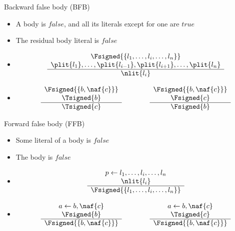 \begin{frame}{Backward false body (BFB)}
\begin{itemize}
\item {}
  A body is $\mathit{false}$, and all its literals except for one are $\mathit{true}$
\item {} The residual body literal is $\mathit{false}$
\item {}
\[
\begin{array}{c}
\Fsigned{\{l_1,\dots,l_i,\dots,l_n\}} \\
\plit{l_1},\dots,\plit{l_{i-1}},\plit{l_{i+1}},\dots,\plit{l_n} \\\hline
\nlit{l_i}
\end{array}
\]
\item<2-> 
\[
\begin{array}{c}
\Fsigned{\{b, \naf{c}\}} \\
\Tsigned{b} \\\hline
\Tsigned{c}
\end{array}
\qquad\qquad
\begin{array}{c}
\Fsigned{\{b, \naf{c}\}} \\
\Fsigned{c} \\\hline
\Fsigned{b}
\end{array}
\]
\end{itemize}
\end{frame}
\begin{frame}{Forward false body (FFB)}
\begin{itemize}
\item {} Some literal of a body is $\mathit{false}$
\item {} The body is $\mathit{false}$
\item {}
\[
\begin{array}{c}
p \leftarrow l_1,\dots,l_i,\dots,l_n \\
\nlit{l_i} \\\hline
\Fsigned{\{l_1,\dots,l_i,\dots,l_n\}}
\end{array}
\]
\item<2-> 
\[
\begin{array}{c}
a \leftarrow b, \naf{c} \\
\Fsigned{b} \\\hline
\Fsigned{\{b, \naf{c}\}}
\end{array}
\qquad\qquad
\begin{array}{c}
a \leftarrow b, \naf{c} \\
\Tsigned{c} \\\hline
\Fsigned{\{b, \naf{c}\}}
\end{array}
\hfill
\]
\end{itemize}
\end{frame}

